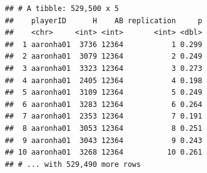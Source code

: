 \documentclass[]{book}
\newenvironment{Shaded}{\begin{snugshade}}{\end{snugshade}}
\newcommand{\CommentTok}[1]{\textcolor[rgb]{0.56,0.35,0.01}{\textit{#1}}}
\newcommand{\DataTypeTok}[1]{\textcolor[rgb]{0.13,0.29,0.53}{#1}}
\newcommand{\DecValTok}[1]{\textcolor[rgb]{0.00,0.00,0.81}{#1}}
\newcommand{\KeywordTok}[1]{\textcolor[rgb]{0.13,0.29,0.53}{\textbf{#1}}}
\newcommand{\NormalTok}[1]{#1}
\newcommand{\OperatorTok}[1]{\textcolor[rgb]{0.81,0.36,0.00}{\textbf{#1}}}
\newcommand{\OtherTok}[1]{\textcolor[rgb]{0.56,0.35,0.01}{#1}}
\newcommand{\StringTok}[1]{\textcolor[rgb]{0.31,0.60,0.02}{#1}}
\begin{document}
\begin{Shaded}
\end{Shaded}

\begin{verbatim}
## # A tibble: 529,500 x 5
##    playerID      H    AB replication     p
##    <chr>     <int> <int>       <int> <dbl>
##  1 aaronha01  3736 12364           1 0.299
##  2 aaronha01  3079 12364           2 0.249
##  3 aaronha01  3323 12364           3 0.273
##  4 aaronha01  2405 12364           4 0.198
##  5 aaronha01  3109 12364           5 0.249
##  6 aaronha01  3283 12364           6 0.264
##  7 aaronha01  2353 12364           7 0.191
##  8 aaronha01  3053 12364           8 0.251
##  9 aaronha01  3043 12364           9 0.243
## 10 aaronha01  3268 12364          10 0.261
## # ... with 529,490 more rows
\end{verbatim}

\begin{Shaded}
\end{Shaded}
\end{document}
